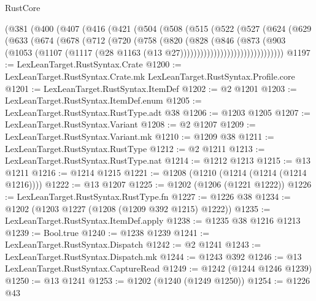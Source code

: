 \begin{lexlean}{RustCore}
\begin{coremodule}
          (@381
            (@400
              (@407
                (@416
                  (@421
                    (@504
                      (@508
                        (@515
                          (@522
                            (@527
                              (@624
                                (@629
                                  (@633
                                    (@674
                                      (@678
                                        (@712
                                          (@720
                                            (@758
                                              (@820
                                                (@828
                                                  (@846
                                                    (@873
                                                      (@903
                                                        (@1053
                                                          (@1107
                                                            (@1117
                                                              (@28
                                                                @1163
                                                                (@13
                                                                  @27)))))))))))))))))))))))))))))))
@1197 := LexLeanTarget.RustSyntax.Crate
@1200 := LexLeanTarget.RustSyntax.Crate.mk LexLeanTarget.RustSyntax.Profile.core
@1201 := LexLeanTarget.RustSyntax.ItemDef
@1202 := @2 @1201
@1203 := LexLeanTarget.RustSyntax.ItemDef.enum
@1205 := LexLeanTarget.RustSyntax.RustType.adt @38
@1206 := @1203 @1205
@1207 := LexLeanTarget.RustSyntax.Variant
@1208 := @2 @1207
@1209 := LexLeanTarget.RustSyntax.Variant.mk
@1210 := @1209 @38
@1211 := LexLeanTarget.RustSyntax.RustType
@1212 := @2 @1211
@1213 := LexLeanTarget.RustSyntax.RustType.nat
@1214 := @1212 @1213
@1215 := @13 @1211
@1216 := @1214 @1215
@1221 := @1208 (@1210 (@1214 (@1214 (@1214 @1216))))
@1222 := @13 @1207
@1225 := @1202 (@1206 (@1221 @1222))
@1226 := LexLeanTarget.RustSyntax.RustType.fn
@1227 := @1226 @38
@1234 := @1202 (@1203 @1227 (@1208 (@1209 @392 @1215) @1222))
@1235 := LexLeanTarget.RustSyntax.ItemDef.apply
@1238 := @1235 @38 @1216 @1213
@1239 := Bool.true
@1240 := @1238 @1239
@1241 := LexLeanTarget.RustSyntax.Dispatch
@1242 := @2 @1241
@1243 := LexLeanTarget.RustSyntax.Dispatch.mk
@1244 := @1243 @392
@1246 := @13 LexLeanTarget.RustSyntax.CaptureRead
@1249 := @1242 (@1244 @1246 @1239)
@1250 := @13 @1241
@1253 := @1202 (@1240 (@1249 @1250))
@1254 := @1226 @43

\end{coremodule}
\end{lexlean}
